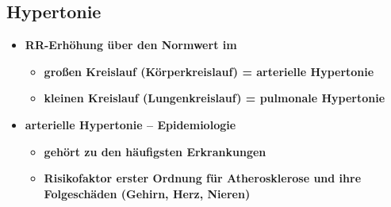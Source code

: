 	\subsection*{Hypertonie}
		\begin{itemize}
			\item \textbf{RR-Erhöhung über den Normwert im}
				\begin{itemize}
					\item \textbf{großen Kreislauf (Körperkreislauf) = arterielle Hypertonie}
					\item \textbf{kleinen Kreislauf (Lungenkreislauf) = pulmonale Hypertonie}
				\end{itemize}
			\item \textbf{arterielle Hypertonie – Epidemiologie}
				\begin{itemize}
					\item \textbf{gehört zu den häufigsten Erkrankungen}
					\item \textbf{Risikofaktor erster Ordnung für Atherosklerose und ihre Folgeschäden (Gehirn, Herz, Nieren)}
				\end{itemize}
		\end{itemize}
